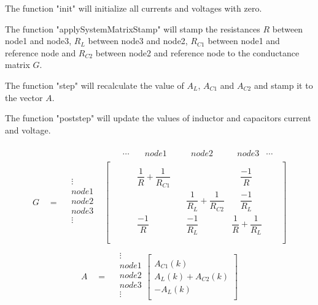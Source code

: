 The function "init" will initialize all currents and voltages with zero.

The function "applySystemMatrixStamp" will stamp the resistances $R$ between node1 and node3, $R_L$ between node3 and node2, $R_{C1}$ between node1 and reference node and $R_{C2}$ between node2 and reference node to the conductance matrix $G$.

The function "step" will recalculate the value of $A_L$, $A_{C1}$ and $A_{C2}$ and stamp it to the vector $A$.

The function "poststep" will update the values of inductor and capacitors current and voltage.

\begin{align}
\begin{split}
&
\begin{matrix}
& \quad \cdots & \quad node1 \quad & \quad node2 \quad &  \quad node3 & \cdots
\end{matrix}\\[-6pt]
G \quad = \quad
\begin{matrix}
\vdots\\[8pt]
node1\\[8pt]
node2\\[8pt]
node3\\[8pt]
\vdots\\
\end{matrix}
&
\begin{bmatrix}
	\quad & \quad &  \\[8pt]
	\quad & \quad \dfrac{1}{R} + \dfrac{1}{R_{C1}} & \quad & \quad \dfrac{-1}{R} & \quad  \\[8pt]
	\quad & \quad & \quad \dfrac{1}{R_L} + \dfrac{1}{R_{C2}} & \quad \dfrac{-1}{R_L} & \quad \\[8pt]
	\quad & \quad \dfrac{-1}{R} & \quad \dfrac{-1}{R_L} & \dfrac{1}{R}+\dfrac{1}{R_L} & \quad\\[8pt]
	\quad\\ 
\end{bmatrix}
\end{split}
\end{align}
\begin{align}
\begin{split}
A\quad = \quad
\begin{matrix}
\vdots\\[8pt]
node1\\[8pt]
node2\\[8pt]
node3\\[8pt]
\vdots\\
\end{matrix}
\begin{bmatrix}
	\quad \\[8pt]
	A_{C1}(k) \\[8pt]
	A_L(k) + A_{C2}(k) \\[8pt]
	-A_L(k) \\[8pt]
	\quad
\end{bmatrix}
\end{split}
\end{align}

